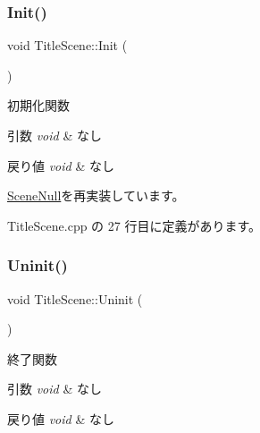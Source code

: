 \subsubsection{\texorpdfstring{Init()}{Init()}}
{\footnotesize\ttfamily void Title\+Scene\+::\+Init (\begin{DoxyParamCaption}{ }\end{DoxyParamCaption})\hspace{0.3cm}{\ttfamily [virtual]}}



初期化関数 


\begin{DoxyParams}{引数}
{\em void} & なし \\
\hline
\end{DoxyParams}

\begin{DoxyRetVals}{戻り値}
{\em void} & なし \\
\hline
\end{DoxyRetVals}


\mbox{\hyperlink{class_scene_null_a6b27830a755687f2c00149bcfa739388}{Scene\+Null}}を再実装しています。



 Title\+Scene.\+cpp の 27 行目に定義があります。

\mbox{\label{class_title_scene_a65fcb66cfab634ff7b0f6b69bbc63d7c}} 
\subsubsection{\texorpdfstring{Uninit()}{Uninit()}}
{\footnotesize\ttfamily void Title\+Scene\+::\+Uninit (\begin{DoxyParamCaption}{ }\end{DoxyParamCaption})\hspace{0.3cm}{\ttfamily [virtual]}}



終了関数 


\begin{DoxyParams}{引数}
{\em void} & なし \\
\hline
\end{DoxyParams}

\begin{DoxyRetVals}{戻り値}
{\em void} & なし \\
\hline
\end{DoxyRetVals}



